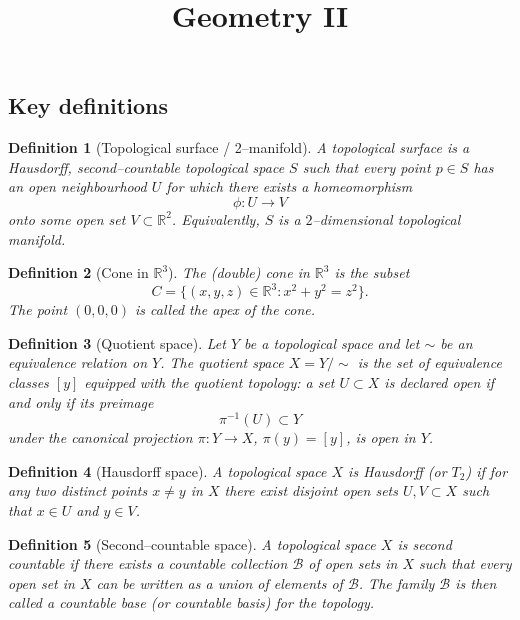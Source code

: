 \documentclass[12pt,a4paper]{article}
\title{Geometry II}
\author{}
\date{}
\theoremstyle{plain}
\newtheorem{definition}{Definition}
\theoremstyle{definition}      %
\begin{document}
	\maketitle
	

\subsection*{Key definitions}

\begin{definition}[Topological surface / 2--manifold]
	A \emph{topological surface} is a Hausdorff, second--countable topological
	space $S$ such that every point $p\in S$ has an open neighbourhood $U$
	for which there exists a homeomorphism
	\[
	\phi:U \longrightarrow V
	\]
	onto some open set $V\subset\mathbb{R}^2$.
	Equivalently, $S$ is a $2$--dimensional topological manifold.
\end{definition}

\begin{definition}[Cone in $\mathbb{R}^3$]
	The (double) cone in $\mathbb{R}^3$ is the subset
	\[
	C = \{(x,y,z)\in\mathbb{R}^3 : x^2 + y^2 = z^2\}.
	\]
	The point $(0,0,0)$ is called the \emph{apex} of the cone.
\end{definition}

\begin{definition}[Quotient space]
	Let $Y$ be a topological space and let $\sim$ be an equivalence relation
	on $Y$.  The \emph{quotient space} $X = Y/{\sim}$ is the set of
	equivalence classes $[y]$ equipped with the \emph{quotient topology}:
	a set $U\subset X$ is declared open if and only if its preimage
	\[
	\pi^{-1}(U) \subset Y
	\]
	under the canonical projection $\pi:Y\to X$, $\pi(y)=[y]$, is open in $Y$.
\end{definition}

\begin{definition}[Hausdorff space]
	A topological space $X$ is \emph{Hausdorff} (or $T_2$) if for any two
	distinct points $x\neq y$ in $X$ there exist disjoint open sets
	$U,V\subset X$ such that $x\in U$ and $y\in V$.
\end{definition}

\begin{definition}[Second--countable space]
	A topological space $X$ is \emph{second countable} if there exists a
	countable collection $\mathcal{B}$ of open sets in $X$ such that every
	open set in $X$ can be written as a union of elements of $\mathcal{B}$.
	The family $\mathcal{B}$ is then called a \emph{countable base} (or
	\emph{countable basis}) for the topology.
\end{definition}
\end{document}
